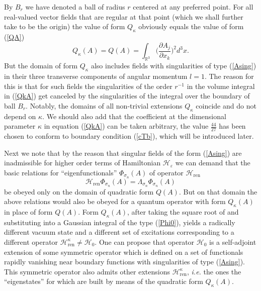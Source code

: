\documentclass[12pt]{article}
\newcommand{\HH}{\mathscr{H}}
\newcommand{\RR}{\mathbb{R}}
\newcommand{\ve}{\varepsilon}
\begin{document}
	By
$ B_{r} $ we have denoted a ball of radius
$ r $
	centered at any preferred point.
    For all real-valued vector fields that are regular at that point
    (which we shall further take to be the origin) the value of form
$ Q_{\kappa} $
	obviously equals the value of form
(\ref{QA})
\begin{equation*}
        Q_{\kappa}(A) = Q(A) = \int_{\RR^{3}}
        \bigl(\frac{\partial A_{j}}{\partial x_{k}}\bigr)^{2} d^{3} x .
\end{equation*}
	But the domain of form
$ Q_{\kappa} $
	also includes fields with singularities of type
(\ref{Asing})
	in their three transverse components
	of angular momentum
$ l=1 $.
	The reason for this is that for such fields
	the singularities of the order
$ r^{-1} $
	in the volume integral in
(\ref{QkA})
	get canceled by the singularities of the integral over the boundary of
    ball
$ B_{r} $.
	Notably, the domains of all non-trivial extensions
$ Q_{\kappa} $
	coincide and do not depend on
$ \kappa $.
	We should also add that the coefficient at the dimensional parameter
$ \kappa $
	in equation
(\ref{QkA})
	can be taken arbitrary,
	the value
$ \frac{44}{27} $
	has been chosen to conform to boundary condition
(\ref{cTb}),
	which will be introduced later.

	Next we note that
	by the reason that singular fields of the form
(\ref{Asing})
	are inadmissible for higher order terms of Hamiltonian
$ \HH_{\ve} $
    we can demand that the basic relations for
    ``eigenfunctionals''
$ \Phi_{\sigma_{n}}(A) $
	of operator
$ \HH_{\text{ren}} $
\begin{equation*}
    \HH_{\text{ren}} \Phi_{\sigma_{n}}(A)
	= \Lambda_{\sigma_{n}} \Phi_{\sigma_{n}}(A)
\end{equation*}
	be obeyed only on the domain of quadratic form
$ Q(A) $.
	But on that domain the above relations would also be obeyed
	for a quantum operator with form
$ Q_{\kappa}(A) $
	in place of form
$ Q(A) $.
	Form
$ Q_{\kappa}(A) $,
	after taking the square root of and substituting into a Gaussian integral
	of the type 
(\ref{Phi0}),
	yields a radically different vacuum state and a different set of
	excitations corresponding to a different operator
$ \HH_{\text{ren}}^{\kappa} \neq \HH_{0} $.
	One can propose that operator
$ \HH_{0} $
	is a self-adjoint extension of some symmetric operator
	which is defined on a set of functionals rapidly vanishing near
	boundary functions with singularities of type
(\ref{Asing}).
	This symmetric operator also admits other extensions 
$ \HH_{\text{ren}}^{\kappa} $,
{\it i.e.} the ones
	the ``eigenstates'' for which are built by means of the quadratic form
$ Q_{\kappa}(A) $.
\end{document}
